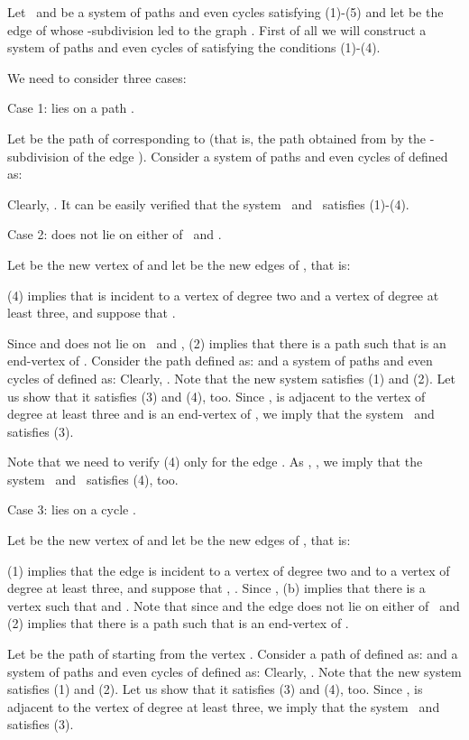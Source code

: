 \documentclass[fleqn,12pt,twoside]{article}
\newenvironment{proof}[1][Proof.]{\begin{trivlist}
\item[\hskip \labelsep {\bfseries #1}]}{\end{trivlist}}
\begin{document}
\begin{proof}
Let \textit{\ }and  be a system of
paths
and even cycles satisfying (1)-(5) and let  be the edge of  whose -subdivision led to the graph . First of all we will
construct a system of paths and even cycles of 
satisfying the conditions (1)-(4).

We need to consider three cases:

Case 1:  lies on a path .

Let  be the path of  corresponding to 
(that is, the path obtained from  by the -subdivision of the
edge ). Consider a system of paths and even cycles of  defined as:

Clearly, . It can be easily verified that the system \textit{\ }and\textit{\ } satisfies (1)-(4).

Case 2:  does not lie on either of \textit{\ }and  .

Let  be the new vertex of  and let  be the new edges of , that is:

(4) implies that  is incident to a vertex  of degree two and a vertex  of degree at least three, and suppose that .\newline

Since  and  does not lie on \textit{\ }and  , (2) implies that there is a path  such that  is an end-vertex of .
Consider the path  defined as:
and a system of paths and even cycles of  defined as:
Clearly, . Note that the new system satisfies (1) and
(2). Let us show that it satisfies (3) and (4), too. Since
,  is adjacent to the vertex  of
degree at least three
and  is an end-vertex of , we imply that the system \textit{\ }and\textit{\ } satisfies (3).

Note that we need to verify (4) only for the edge . As , , we imply that
the
system \textit{\ }and\textit{\ } satisfies (4), too.

Case 3:  lies on a cycle .

Let  be the new vertex of  and let  be the new edges of , that is:


(1) implies that the edge  is incident to a vertex  of degree
two and to a vertex  of degree at least three, and suppose that
, . Since
, (b)
implies that there is a vertex  such that  and . Note that since  and the edge 
does not lie on either of \textit{\ }and
 (2) implies that there is a path  such that  is an end-vertex of .

Let  be the path  of  starting from the vertex .
Consider a path  of  defined as:
and a system of paths and even cycles of  defined as:
Clearly, . Note that the new system satisfies (1) and
(2). Let us show that it satisfies (3) and (4), too. Since
,  is adjacent to the vertex  of
degree at least three, we imply that the system \textit{\ }and\textit{\
} satisfies (3).


\end{proof}
\end{document}
